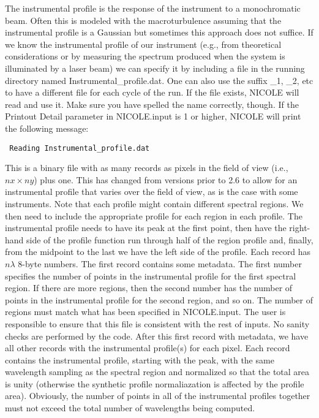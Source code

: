 The instrumental profile is the response of the instrument to a
monochromatic beam. Often this is modeled with the macroturbulence
assuming that the instrumental profile is a Gaussian but sometimes
this approach does not suffice. If we know the instrumental profile of
our instrument (e.g., from theoretical considerations or by measuring
the spectrum produced when the system is illuminated by a laser beam)
we can specify it by including a file in the running directory
named Instrumental\_profile.dat. One can also use the suffix \_1, \_2,
etc to have a different file for each cycle of the run. If the file
exists, NICOLE will read and use it. Make sure you have spelled the
name correctly, though. If the Printout Detail parameter in
NICOLE.input is 1 or higher, NICOLE will print the following message:
\begin{verbatim}
 Reading Instrumental_profile.dat
\end{verbatim}
This is a binary file with as many records as pixels in the field of
view (i.e., $nx \times ny$) plus one. This has changed from versions
prior to 2.6 to allow for an instrumental profile that varies over the
field of view, as is the case with some instruments. Note that each
profile might contain different spectral regions. We then need to
include the appropriate profile for each region in each profile. The
instrumental profile needs to have its peak at the first point, then
have the right-hand side of the profile function run through half of
the region profile and, finally, from the midpoint to the last we have
the left side of the profile.  Each record has $n\lambda$ 8-byte
numbers. The first record contains some metadata. The first number
specifies the number of points in the instrumental profile for the
first spectral region. If there are more regions, then the second
number has the number of points in the instrumental profile for the
second region, and so on. The number of regions must match what has
been specified in NICOLE.input. The user is responsible to ensure that
this file is consistent with the rest of inputs. No sanity checks are
performed by the code. After this first record with metadata, we have
all other records with the instrumental profile(s) for each
pixel. Each record contains the instrumental profile, starting with
the peak, with the same wavelength sampling as the spectral region and
normalized so that the total area is unity (otherwise the synthetic
profile normaliazation is affected by the profile area). Obviously,
the number of points in all of the instrumental profiles together must
not exceed the total number of wavelengths being computed.

